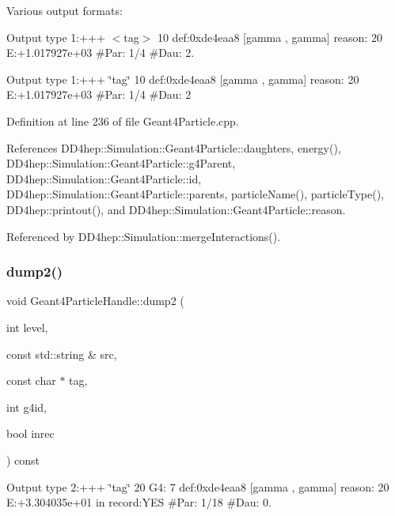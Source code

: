Various output formats\+: 

Output type 1\+:+++ $<$tag$>$ 10 def\+:0xde4eaa8 \mbox{[}gamma , gamma\mbox{]} reason\+: 20 E\+:+1.017927e+03 \#Par\+: 1/4 \#Dau\+: 2.

Output type 1\+:+++ \char`\"{}tag\char`\"{} 10 def\+:0xde4eaa8 \mbox{[}gamma , gamma\mbox{]} reason\+: 20 E\+:+1.017927e+03 \#Par\+: 1/4 \#Dau\+: 2 

Definition at line 236 of file Geant4\+Particle.\+cpp.



References D\+D4hep\+::\+Simulation\+::\+Geant4\+Particle\+::daughters, energy(), D\+D4hep\+::\+Simulation\+::\+Geant4\+Particle\+::g4\+Parent, D\+D4hep\+::\+Simulation\+::\+Geant4\+Particle\+::id, D\+D4hep\+::\+Simulation\+::\+Geant4\+Particle\+::parents, particle\+Name(), particle\+Type(), D\+D4hep\+::printout(), and D\+D4hep\+::\+Simulation\+::\+Geant4\+Particle\+::reason.



Referenced by D\+D4hep\+::\+Simulation\+::merge\+Interactions().

\hypertarget{class_d_d4hep_1_1_simulation_1_1_geant4_particle_handle_a75abe8ec76652163d20b7746cd580f57}{}\label{class_d_d4hep_1_1_simulation_1_1_geant4_particle_handle_a75abe8ec76652163d20b7746cd580f57} 
\subsubsection{\texorpdfstring{dump2()}{dump2()}}
{\footnotesize\ttfamily void Geant4\+Particle\+Handle\+::dump2 (\begin{DoxyParamCaption}\item[{int}]{level,  }\item[{const std\+::string \&}]{src,  }\item[{const char $\ast$}]{tag,  }\item[{int}]{g4id,  }\item[{bool}]{inrec }\end{DoxyParamCaption}) const}



Output type 2\+:+++ \char`\"{}tag\char`\"{} 20 G4\+: 7 def\+:0xde4eaa8 \mbox{[}gamma , gamma\mbox{]} reason\+: 20 E\+:+3.304035e+01 in record\+:Y\+ES \#Par\+: 1/18 \#Dau\+: 0. 

